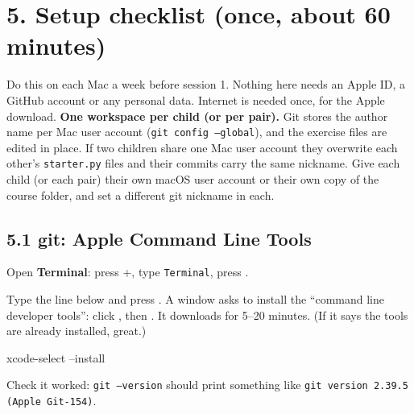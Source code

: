 \documentclass[level=3,teacher]{kidscode}
\begin{document}
\section{5. Setup checklist (once, about 60 minutes)}

Do this on each Mac a week before session 1. Nothing here needs an Apple ID, a GitHub account or
any personal data. Internet is needed once, for the Apple download.
\textbf{One workspace per child (or per pair).} Git stores the author name per Mac user account
(\texttt{git config --global}), and the exercise files are edited in place. If two children share one
Mac user account they overwrite each other's \texttt{starter.py} files and their commits carry the same
nickname. Give each child (or each pair) their own macOS user account or their own copy of the course
folder, and set a different git nickname in each.

\subsection{5.1 git: Apple Command Line Tools}
\begin{checklist}
  \item Open \textbf{Terminal}: press +, type \texttt{Terminal}, press .
  \item Type the line below and press . A window asks to install the
        \enquote{command line developer tools}: click , then . It
        downloads for 5--20 minutes. (If it says the tools are already installed, great.)
\end{checklist}
\begin{shellcode}
xcode-select --install
\end{shellcode}
\begin{checklist}
  \item Check it worked: \texttt{git --version} should print something like
        \texttt{git version 2.39.5 (Apple Git-154)}.
\end{checklist}
\end{document}
